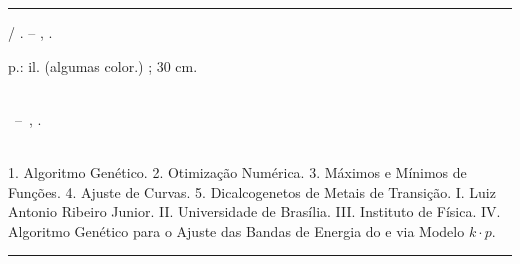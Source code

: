 \begin{fichacatalografica}
  \vspace*{\fill}                   %
  \hrule                            %
  \begin{center}                    %
    \begin{minipage}[c]{12.5cm}     %
      
      \imprimirautor
      
      \hspace{0.5cm} \imprimirtitulo  / \imprimirautor. --
      \imprimirlocal, \imprimirdata.
      
      \hspace{0.5cm} \pageref{LastPage} p.: il. (algumas color.) ; 30 cm.\\
      
      \hspace{0.5cm} \imprimirorientadorRotulo~\imprimirorientador\\
      
      \hspace{0.5cm}
      \parbox[t]{\textwidth}{\imprimirtipotrabalho~--~\imprimirinstituicao,
        \imprimirdata.}\\
      
      \hspace{0.5cm}
      1. Algoritmo Genético.
      2. Otimização Numérica.
      3. Máximos e Mínimos de Funções.
      4. Ajuste de Curvas.
      5. Dicalcogenetos de Metais de Transição.
      I. Luiz Antonio Ribeiro Junior.
      II. Universidade de Brasília.
      III. Instituto de Física.
      IV. Algoritmo Genético para o Ajuste das Bandas de Energia do  e  via Modelo $k \cdot p$.\\
      
      
    \end{minipage}
  \end{center}
  \hrule
\end{fichacatalografica}